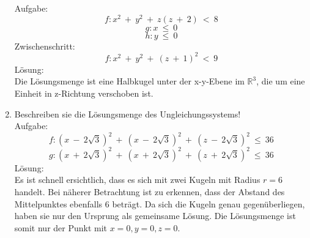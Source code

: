 \begin{enumerate}
				Aufgabe:
					\[f : x^2 \ + \ y^2 \ + \ z (z \ + \ 2) \ < \ 8 \]
					\[g : x \ \leq \ 0 \]
					\[h : y \ \leq \ 0 \]
				Zwischenschritt:
					\[f : x^2 \ + \ y^2 \ + \ (z \ + \ 1)^2 \ < \ 9\]
				L\"osung: \\
				Die L\"osungsmenge ist eine Halbkugel unter der x-y-Ebene im $ \mathbb{R}^3 $, die um eine Einheit in z-Richtung verschoben ist.
	\item Beschreiben sie die L\"osungsmenge des Ungleichungssystems! \\
				Aufgabe:
					\[f : (x \ - \ 2 \sqrt 3)^2 \ + \ (x \ - \ 2 \sqrt 3)^2 \ + \ (z \ - \ 2 \sqrt 3)^2 \ \leq \ 36\]
					\[g : (x \ + \ 2 \sqrt 3)^2 \ + \ (x \ + \ 2 \sqrt 3)^2 \ + \ (z \ + \ 2 \sqrt 3)^2 \ \leq \ 36\]
				L\"osung: \\
				Es ist schnell ersichtlich, dass es sich mit zwei Kugeln mit Radius $ r = 6 $ handelt. 
				Bei n\"aherer Betrachtung ist zu erkennen, dass der Abstand des Mittelpunktes ebenfalls 6 betr\"agt.
				Da sich die Kugeln genau gegen\"uberliegen, haben sie nur den Ursprung als gemeinsame L\"osung.
				Die L\"osungsmenge ist somit nur der Punkt mit $ x = 0, y = 0, z = 0 $.
\end{enumerate}
